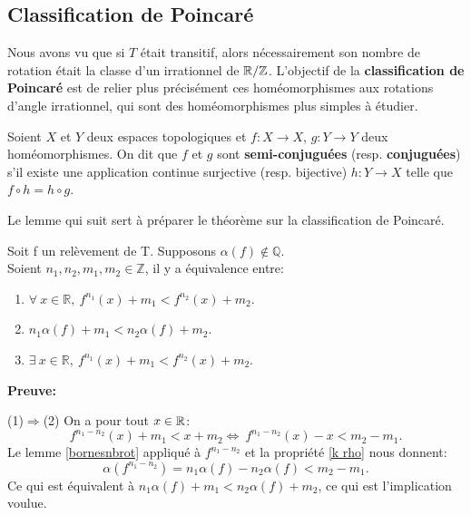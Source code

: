 \subsection{Classification de Poincaré}
Nous avons vu que si $T$ était transitif, alors nécessairement son nombre de rotation était la classe d'un irrationnel de $\mathbb{R}/\mathbb{Z}$. L'objectif de la \textbf{classification de Poincaré} est de relier plus précisément ces homéomorphismes aux rotations d'angle irrationnel, qui sont des homéomorphismes plus simples à étudier.\\


\begin{definition}
	Soient $X$ et $Y$ deux espaces topologiques et $f:X\to X$, $g:Y \to Y$ deux homéomorphismes. On dit que $f$ et $g$ sont \textbf{semi-conjuguées} (resp. \textbf{conjuguées}) s'il existe une application continue surjective (resp. bijective) $h : Y \to X$ telle que $f\circ h = h \circ g$.
\end{definition}


Le lemme qui suit sert à préparer le théorème sur la classification de Poincaré.






\begin{lemma}
	Soit f un relèvement de T. Supposons $\alpha(f) \notin \mathbb{Q}$.\\ Soient $n_1,n_2, m_1, m_2 \in \mathbb{Z}$, il y a équivalence entre:
	\begin{enumerate}
	\item $\forall \ x \in \mathbb{R}, \ f^{n_1}(x)+m_1 < f^{n_2}(x)+m_2$.
	\item $n_1 \alpha(f) + m_1 < n_2 \alpha(f) + m_2$.
	\item $\exists \ x \in \mathbb{R}, \ f^{n_1}(x)+m_1 < f^{n_2}(x)+m_2$.
	\end{enumerate}
\end{lemma}


	\textbf{Preuve:}\label{lemme poincaré}
	\par(1)$\Rightarrow$(2) On a pour tout $x \in {\mathbb{R}}$:
	$$ f^{n_1- n_2}(x) + m_1 < x +m_2 \Longleftrightarrow \ f^{n_1- n_2}(x) - x < m_2 -m_1.$$
		Le lemme \ref{bornesnbrot} appliqué à $f^{n_1 - n_2}$ et la propriété \ref{k rho} nous donnent:
		$$\alpha(f^{n_1 - n_2})=n_1 \alpha(f) - n_2 \alpha(f) < m_2 -m_1 .$$
	Ce qui est équivalent à $n_1 \alpha(f) + m_1 < n_2 \alpha(f) +m_2$, ce qui est l'implication voulue.\\

